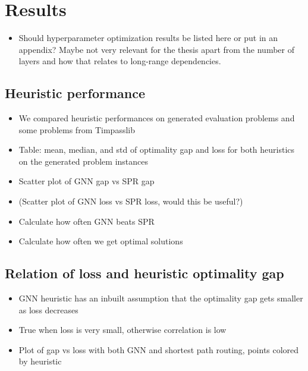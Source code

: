 \documentclass[english, 12pt, a4paper, sci, utf8, a-2b, online]{aaltothesis}
\begin{document}
\section{Results}
\begin{itemize}
    \item Should hyperparameter optimization results be listed here or put in an appendix? Maybe not very relevant for the thesis apart from the number of layers and how that relates to long-range dependencies.
\end{itemize}
\subsection{Heuristic performance}

\begin{itemize}
    \item We compared heuristic performances on generated evaluation problems and some problems from Timpasslib
    \item Table: mean, median, and std of optimality gap and loss for both heuristics on the generated problem instances
    \item Scatter plot of GNN gap vs SPR gap
    \item (Scatter plot of GNN loss vs SPR loss, would this be useful?)
    \item Calculate how often GNN beats SPR
    \item Calculate how often we get optimal solutions
\end{itemize}

\subsection{Relation of loss and heuristic optimality gap}

\begin{itemize}
    \item GNN heuristic has an inbuilt assumption that the optimality gap gets smaller as loss decreases
    \item True when loss is very small, otherwise correlation is low
    \item Plot of gap vs loss with both GNN and shortest path routing, points colored by heuristic
\end{itemize}
\end{document}
